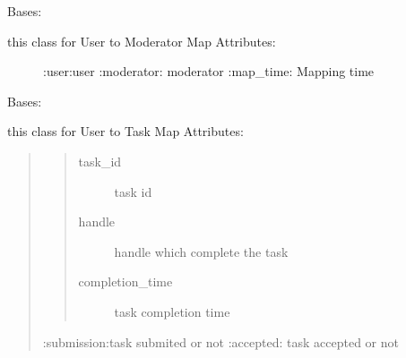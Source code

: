 \documentclass[letterpaper,10pt,english]{sphinxmanual}
\begin{document}
\begin{fulllineitems}
\label{\detokenize{janta:janta.models.UserModeratorMap}}
Bases: 
\begin{description}
\item[{this class for User to Moderator Map Attributes:}] \leavevmode
:user:user
:moderator: moderator
:map\_time: Mapping time

\end{description}

\begin{fulllineitems}
\label{\detokenize{janta:janta.models.UserModeratorMap.set_user_moderator}}
\end{fulllineitems}


\end{fulllineitems}


\begin{fulllineitems}
\label{\detokenize{janta:janta.models.UserTaskMap}}
Bases: 

this class for User to Task Map
Attributes:
\begin{quote}
\begin{quote}\begin{description}
\item[{task\_id}] \leavevmode
task id

\item[{handle}] \leavevmode
handle which complete the task

\item[{completion\_time}] \leavevmode
task completion time

\end{description}\end{quote}

:submission:task submited or not 
:accepted: task accepted or not
\end{quote}

\begin{fulllineitems}
\label{\detokenize{janta:janta.models.UserTaskMap.set_user_task_map}}
\end{fulllineitems}


\end{fulllineitems}
\end{document}
